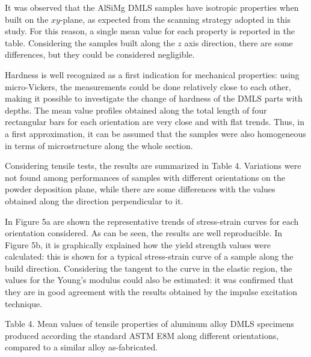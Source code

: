 \documentclass[10pt]{article}
\begin{document}
It was observed that the AlSiMg DMLS samples have isotropic properties when built on the $x y$-plane, as expected from the scanning strategy adopted in this study. For this reason, a single mean value for each property is reported in the table. Considering the samples built along the $z$ axis direction, there are some differences, but they could be considered negligible.

Hardness is well recognized as a first indication for mechanical properties: using micro-Vickers, the measurements could be done relatively close to each other, making it possible to investigate the change of hardness of the DMLS parts with depths. The mean value profiles obtained along the total length of four rectangular bars for each orientation are very close and with flat trends. Thus, in a first approximation, it can be assumed that the samples were also homogeneous in terms of microstructure along the whole section.

Considering tensile tests, the results are summarized in Table 4. Variations were not found among performances of samples with different orientations on the powder deposition plane, while there are some differences with the values obtained along the direction perpendicular to it.

In Figure 5a are shown the representative trends of stress-strain curves for each orientation considered. As can be seen, the results are well reproducible. In Figure 5b, it is graphically explained how the yield strength values were calculated: this is shown for a typical stress-strain curve of a sample along the build direction. Considering the tangent to the curve in the elastic region, the values for the Young's modulus could also be estimated: it was confirmed that they are in good agreement with the results obtained by the impulse excitation technique.

Table 4. Mean values of tensile properties of aluminum alloy DMLS specimens produced according the standard ASTM E8M along different orientations, compared to a similar alloy as-fabricated.
\end{document}
